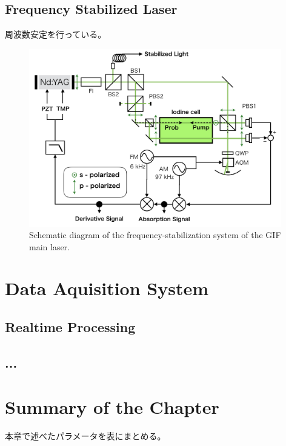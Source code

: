\subsection{Frequency Stabilized Laser}

周波数安定を行っている。

\begin{figure}[h]
  \begin{center}   
    \includegraphics[width=11cm]{./img_chap4/img417.png}
    \caption{Schematic diagram of the frequency-stabilization system of the GIF main laser.}\label{img:img417}
  \end{center}
\end{figure}

\section{Data Aquisition System} \label{sec:sec33}
\subsection{Realtime Processing}


\subsection{...}



\section{Summary of the Chapter} %
本章で述べたパラメータを表にまとめる。
